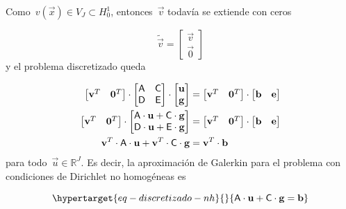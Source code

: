 \documentclass[
  12pt,
  a4paper,
  table]{scrbook}
\theoremstyle{plain}
\theoremstyle{definition}
\theoremstyle{plain}
\theoremstyle{plain}
\theoremstyle{remark}
\begin{document}
Como~\(v(\vec{x}) \in V_J \subset H^1_0\), entonces~\(\vec{v}\) todavía
se extiende con ceros

\[
\tilde{\vec{v}} =
\begin{bmatrix}
\vec{v} \\
\vec{0}
\end{bmatrix}
\] y el problema discretizado queda

\[
\begin{aligned}
\begin{bmatrix}
\mathbf{v}^T & \mathbf{0}^T
\end{bmatrix}
\cdot
\begin{bmatrix}
\mathsf{A} & \mathsf{C} \\
\mathsf{D} & \mathsf{E}
\end{bmatrix}
\cdot
\begin{bmatrix}
\mathbf{u} \\
\mathbf{g}
\end{bmatrix}
&=
\begin{bmatrix}
\mathbf{v}^T & \mathbf{0}^T
\end{bmatrix}
\cdot
\begin{bmatrix}
\mathbf{b} & \mathbf{e}
\end{bmatrix} \\
\begin{bmatrix}
\mathbf{v}^T & \mathbf{0}^T
\end{bmatrix}
\cdot
\begin{bmatrix}
\mathsf{A} \cdot \mathbf{u} + \mathsf{C} \cdot \mathbf{g} \\
\mathsf{D} \cdot \mathbf{u} + \mathsf{E} \cdot \mathbf{g}
\end{bmatrix}
&=
\begin{bmatrix}
\mathbf{v}^T & \mathbf{0}^T
\end{bmatrix}
\cdot
\begin{bmatrix}
\mathbf{b} & \mathbf{e}
\end{bmatrix} \\
\mathbf{v}^T \cdot \mathsf{A} \cdot \mathbf{u} + \mathbf{v}^T \cdot \mathsf{C} \cdot \mathbf{g} &= \mathbf{v}^T \cdot \mathbf{b}
\end{aligned}
\] para todo~\(\vec{u} \in \mathbb{R}^J\). Es decir, la aproximación de
Galerkin para el problema con condiciones de Dirichlet no homogéneas es

\begin{equation}\protect\hypertarget{eq-discretizado-nh}{}{
\mat{A} \cdot \vec{u} + \mat{C} \cdot \vec{g} = \vec{b}
}\label{eq-discretizado-nh}\end{equation}
\end{document}

